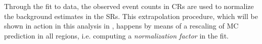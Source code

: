 Through the fit to data, the observed event counts in CRs are used to normalize the background estimates in the SRs. This extrapolation procedure, which will be shown in action in this analysis in \Fig{\ref{fig:regions}}, happens by means of a rescaling of MC prediction in all regions, i.e. computing a \emph{normalization factor} in the fit.





